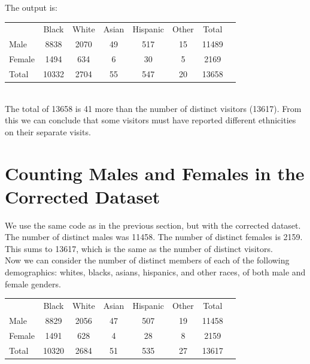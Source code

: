 \documentclass{article}
\begin{document}
The output is:\\

\begin{tabular}{l*{6} c r}
       & Black & White & Asian & Hispanic & Other & Total \\
Male   & 8838 & 2070 & 49 & 517 & 15 & 11489 \\
Female & 1494 & 634 & 6 & 30 & 5 & 2169 \\
Total  & 10332 & 2704 & 55 & 547 & 20 & 13658 \\
\end{tabular}\\

The total of 13658 is 41 more than the number of distinct visitors (13617). From this we can conclude that some visitors must have reported different ethnicities on their separate visits.\\

\section{Counting Males and Females in the Corrected Dataset}
We use the same code as in the previous section, but with the corrected dataset. The number of distinct males was 11458. The number of distinct females is 2159. This sums to 13617, which is the same as the number of distinct visitors.\\

Now we can consider the number of distinct members of each of the following demographics: whites, blacks, asians, hispanics, and other races, of both male and female genders.\\

\begin{tabular}{l*{6} c r}
       & Black & White & Asian & Hispanic & Other & Total \\
Male   & 8829 & 2056 & 47 & 507 & 19 & 11458 \\
Female & 1491 & 628 & 4 & 28 & 8 & 2159 \\
Total  & 10320 & 2684 & 51 & 535 & 27 & 13617 \\
\end{tabular}\\
\end{document}
